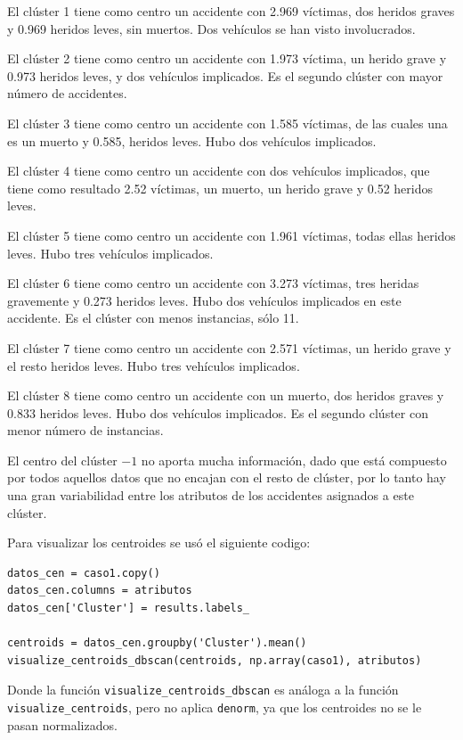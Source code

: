 \documentclass[a4]{article}
\begin{document}
El clúster 1 tiene como centro un accidente con 2.969 víctimas, dos heridos graves y 0.969 heridos leves, sin muertos. Dos vehículos se han visto involucrados.

El clúster 2 tiene como centro un accidente con 1.973 víctima, un herido grave y 0.973 heridos leves, y dos vehículos implicados. Es el segundo clúster con mayor número de accidentes.

El clúster 3 tiene como centro un accidente con 1.585 víctimas, de las cuales una es un muerto y 0.585, heridos leves. Hubo dos vehículos implicados.

El clúster 4 tiene como centro un accidente con dos vehículos implicados, que tiene como resultado 2.52 víctimas, un muerto, un herido grave y 0.52 heridos leves.

El clúster 5 tiene como centro un accidente con 1.961 víctimas, todas ellas heridos leves. Hubo tres vehículos implicados.

El clúster 6 tiene como centro un accidente con 3.273 víctimas, tres heridas gravemente y 0.273 heridos leves. Hubo dos vehículos implicados en este accidente. Es el clúster con menos instancias, sólo 11.

El clúster 7 tiene como centro un accidente con 2.571 víctimas, un herido grave y el resto heridos leves. Hubo tres vehículos implicados.

El clúster 8 tiene como centro un accidente con un muerto, dos heridos graves y 0.833 heridos leves. Hubo dos vehículos implicados. Es el segundo clúster con menor número de instancias.

El centro del clúster $-1$ no aporta mucha información, dado que está compuesto por todos aquellos datos que no encajan con el resto de clúster, por lo tanto hay una gran variabilidad entre los atributos de los accidentes asignados a este clúster.

Para visualizar los centroides se usó el siguiente codigo:

\begin{lstlisting}
datos_cen = caso1.copy()
datos_cen.columns = atributos
datos_cen['Cluster'] = results.labels_

centroids = datos_cen.groupby('Cluster').mean()
visualize_centroids_dbscan(centroids, np.array(caso1), atributos)
\end{lstlisting}

Donde la función \texttt{visualize\_centroids\_dbscan} es análoga a la función \texttt{visualize\_centroids}, pero no aplica \texttt{denorm}, ya que los centroides no se le pasan normalizados.
\end{document}
